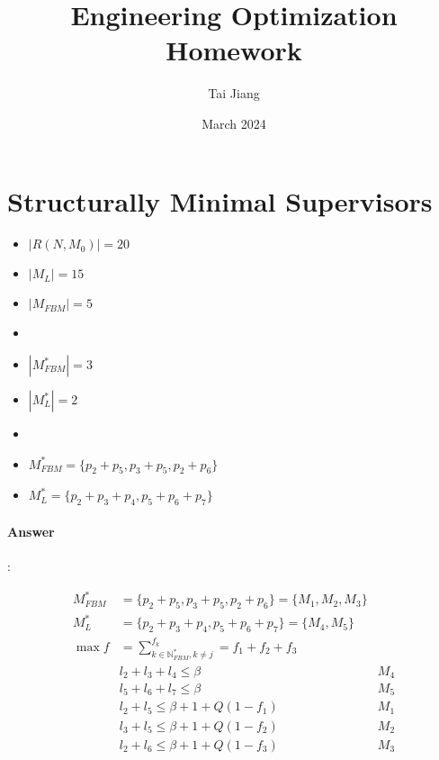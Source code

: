\documentclass{article}
\title{Engineering Optimization Homework}
\author{Tai Jiang}
\date{March 2024}
\begin{document}
  \maketitle
  \section{Structurally Minimal Supervisors}

  \begin{itemize}
    \item[] $\left\lvert R(N, M_0)\right\rvert = 20 $
    \item[] $\left\lvert M_L \right\rvert = 15 $
    \item[] $\left\lvert M_{FBM} \right\rvert = 5 $
    \item[] 
    \item[] $\left\lvert M^*_{FBM} \right\rvert = 3 $
    \item[] $\left\lvert M^*_L \right\rvert = 2 $
    \item[]
    \item[] $M^*_{FBM}=\{p_2+p_5, p_3+p_5, p_2+p_6\} $
    \item[] $M^*_L=\{p_2+p_3+p_4, p_5+p_6+p_7\} $
  \end{itemize}
 
  
  \paragraph{Answer}:

  \begin{equation*}
    \begin{aligned}
      M^*_{FBM} &= \{p_2+p_5, p_3+p_5, p_2+p_6\} = \{ M_1, M_2, M_3\} \\
      M^*_L &= \{p_2+p_3+p_4, p_5+p_6+p_7\} = \{ M_4, M_5\} \\
      \max f &= \sum_{k \in \mathbb{N}^*_{FBM}, k \neq  j }^{f_k}   = f_1 + f_2 + f_3 \\
      & l_2 + l_3 + l_4 \leq \beta & M_4 \\
      & l_5 + l_6 + l_7 \leq \beta & M_5 \\
      & l_2 + l_5 \leq \beta + 1 + Q(1-f_1) & M_1 \\
      & l_3 + l_5 \leq \beta + 1 + Q(1-f_2) & M_2 \\
      & l_2 + l_6 \leq \beta + 1 + Q(1-f_3) & M_3 \\
    \end{aligned}
  \end{equation*}
\end{document}
